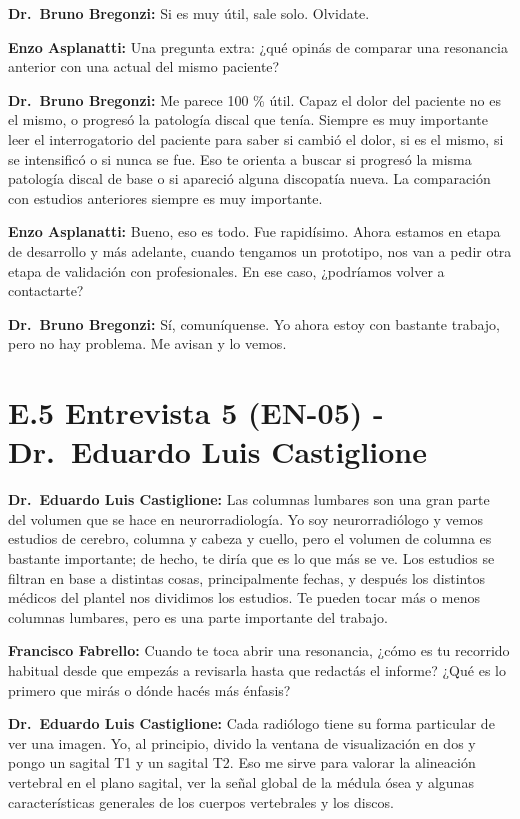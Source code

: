 \noindent\textbf{Dr.~Bruno Bregonzi:} Si es muy útil, sale solo. Olvidate.

\noindent\textbf{Enzo Asplanatti:} Una pregunta extra: ¿qué opinás de comparar una resonancia anterior con una actual del mismo paciente?

\noindent\textbf{Dr.~Bruno Bregonzi:} Me parece 100 \% útil. Capaz el dolor del paciente no es el mismo, o progresó la patología discal que tenía. Siempre es muy importante leer el interrogatorio del paciente para saber si cambió el dolor, si es el mismo, si se intensificó o si nunca se fue. Eso te orienta a buscar si progresó la misma patología discal de base o si apareció alguna discopatía nueva. La comparación con estudios anteriores siempre es muy importante.

\noindent\textbf{Enzo Asplanatti:} Bueno, eso es todo. Fue rapidísimo. Ahora estamos en etapa de desarrollo y más adelante, cuando tengamos un prototipo, nos van a pedir otra etapa de validación con profesionales. En ese caso, ¿podríamos volver a contactarte?

\noindent\textbf{Dr.~Bruno Bregonzi:} Sí, comuníquense. Yo ahora estoy con bastante trabajo, pero no hay problema. Me avisan y lo vemos.
\section*{E.5 Entrevista 5 (EN-05) - Dr.~Eduardo Luis Castiglione}
\label{anexo:entrevista-en05}

\noindent\textbf{Dr.~Eduardo Luis Castiglione:} Las columnas lumbares son una gran parte del volumen que se hace en neurorradiología. Yo soy neurorradiólogo y vemos estudios de cerebro, columna y cabeza y cuello, pero el volumen de columna es bastante importante; de hecho, te diría que es lo que más se ve. Los estudios se filtran en base a distintas cosas, principalmente fechas, y después los distintos médicos del plantel nos dividimos los estudios. Te pueden tocar más o menos columnas lumbares, pero es una parte importante del trabajo.

\noindent\textbf{Francisco Fabrello:} Cuando te toca abrir una resonancia, ¿cómo es tu recorrido habitual desde que empezás a revisarla hasta que redactás el informe? ¿Qué es lo primero que mirás o dónde hacés más énfasis?

\noindent\textbf{Dr.~Eduardo Luis Castiglione:} Cada radiólogo tiene su forma particular de ver una imagen. Yo, al principio, divido la ventana de visualización en dos y pongo un sagital T1 y un sagital T2. Eso me sirve para valorar la alineación vertebral en el plano sagital, ver la señal global de la médula ósea y algunas características generales de los cuerpos vertebrales y los discos.

